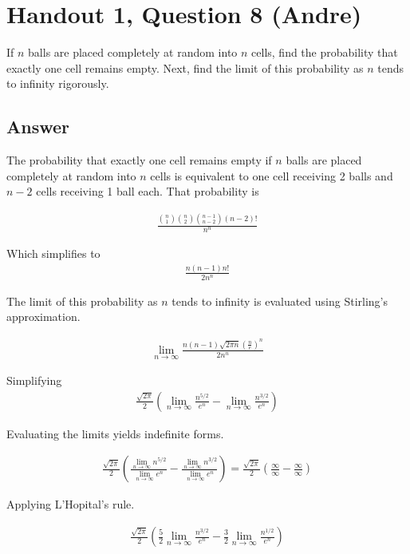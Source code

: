\documentclass[11pt]{article}
\begin{document}
\section*{Handout 1, Question 8 (Andre)}

If \(n\) balls are placed completely at random into \(n\) cells,
find the probability that exactly one cell remains empty.
Next, find the limit of this probability as \(n\) tends to
infinity rigorously.

\subsection*{Answer}

The probability that exactly one cell remains empty if \(n\) balls are placed completely at random into \(n\) cells is equivalent to one cell receiving 2 balls and \(n-2\) cells receiving 1 ball each. That probability is 

\begin{align*}
    \frac{
    \binom{n}{1} \binom{n}{2}\binom{n-1}{n-2}(n-2)!
    }
    {n^n}
\end{align*}

Which simplifies to
\begin{align*}
    \frac{n(n-1)n!}{2n^n
    }
\end{align*}

The limit of this probability as \(n\) tends to infinity is evaluated using Stirling's approximation.

\begin{align*}
    \lim_{n\to \infty} \frac{n(n-1)\sqrt{2\pi n }(\frac{n}{e})^n}{2n^n}
\end{align*}

Simplifying
\begin{align*}
   \frac{\sqrt{2\pi}}{2}(\lim_{n\to \infty} \frac{n^{5/2}}{e^n} -  \lim_{n\to \infty} \frac{n^{3/2}}{e^n})
\end{align*}

Evaluating the limits yields indefinite forms. 

\begin{align*}
   \frac{\sqrt{2\pi}}{2}( \frac{\lim_{n\to \infty} n^{5/2}}{\lim_{n\to \infty}e^n} - \frac{\lim_{n\to \infty}n^{3/2}}{\lim_{n\to \infty}e^n}) = \frac{\sqrt{2\pi}}{2}(\frac{\infty}{\infty} - \frac{\infty}{\infty})
\end{align*}


Applying L'Hopital's rule.

\begin{align*}
   \frac{\sqrt{2\pi}}{2}( \frac{5}{2}\lim_{n\to \infty} \frac{n^{3/2}}{e^n} -  \frac{3}{2}\lim_{n\to \infty} \frac{n^{1/2}}{e^n})
\end{align*}
\end{document}
